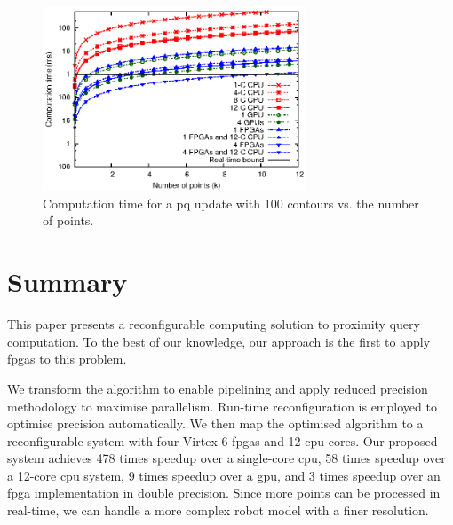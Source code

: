 \begin{figure}[ht]
\begin{center}
\includegraphics[width=0.7\textwidth]{mixed_precision/figures/fig_scalability}
\end{center}
\caption{Computation time for a \gls{pq} update with 100 contours vs. the number of points.}
\label{fig:scalability}
\end{figure}

\section{Summary}
\label{sec:summary}

This paper presents a reconfigurable computing solution to proximity query computation.
To the best of our knowledge, our approach is the first to apply \gls{fpga}s to this problem.

We transform the algorithm to enable pipelining and apply reduced precision methodology to maximise parallelism.
Run-time reconfiguration is employed to optimise precision automatically.
We then map the optimised algorithm to a reconfigurable system with four Virtex-6 \gls{fpga}s and 12 \gls{cpu} cores.
Our proposed system achieves 478 times speedup over a single-core \gls{cpu}, 58 times speedup over a 12-core \gls{cpu} system, 9 times speedup over a \gls{gpu},
and 3 times speedup over an \gls{fpga} implementation in double precision.
Since more points can be processed in real-time, we can handle a more complex robot model with a finer resolution.

